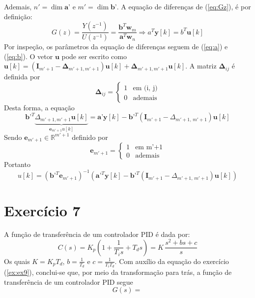 \documentclass{article}
\begin{document}
Ademais, $n' = \dim{\textbf{a'}}$ e $m' = \dim{\textbf{b'}}$. A equação de diferenças de (\ref{eq:Gz}), é por definição:
\begin{equation}
G(z) = \frac{Y(z^{-1})}{U(z^{-1})} = \frac{\textbf{b}^T \textbf{w}_{m}}{\textbf{a}^T \textbf{w}_{n}} \Rightarrow a^T \textbf{y}[k] = b^T \textbf{u}[k]
\label{eq:eqdiferencas}
\end{equation}
Por inspeção, os parâmetros da equação de diferenças seguem de (\ref{eq:a}) e (\ref{eq:b}). O vetor $\textbf{u}$ pode ser escrito como $\textbf{u}[k] = \left(\textbf{I}_{m' + 1} - \mathbf{\Delta}_{m'+1, m'+1}\right) \mathbf{u}[k] + \mathbf{\Delta}_{m'+1, m'+1} \mathbf{u}[k]$. A matriz $\mathbf{\Delta}_{ij}$ é definida por 
\begin{equation}
  \mathbf{\Delta}_{ij} = 
  \begin{cases}
   1 & \mbox{em (i, j)}\\
   0 & \mbox{ademais}
\end{cases}
\end{equation}
Desta forma, a equação 
\begin{equation}
\textbf{b'}^T \underbrace{\Delta_{m' + 1, m' + 1} \textbf{u}[k]}_{\textbf{e}_{m'+1} u[k]} = \textbf{a'} \textbf{y}[k] - \textbf{b'}^T (\textbf{I}_{m'+1} - \Delta_{m' + 1, \, m' + 1}) \textbf{u}[k]
 \end{equation}
Sendo $\textbf{e}_{m'+1} \in \mathbb{R}^{m'+1}$ definido por
\begin{equation}
  \textbf{e}_{m'+1} = 
  \begin{cases}
   1 & \mbox{em m'+1}\\
   0 & \mbox{ademais}
\end{cases}
\end{equation}
Portanto
\begin{equation}
u[k] = (\textbf{b'}^T \textbf{e}_{m' + 1})^{-1}(\textbf{a'}^T \textbf{y}[k] - \textbf{b'}^T (\textbf{I}_{m' + 1} - \Delta_{m' + 1, \, m' + 1}) \textbf{u}[k])
\end{equation}
\section*{Exercício 7}
A função de transferência de um controlador PID é dada por:
\begin{equation}
C(s) = K_p\left(1 + \frac{1}{T_i s} + T_d s\right) = K \, \frac{s^2 + b s + c}{s}
\end{equation}
Os quais $K = K_p T_d $, $b = \frac{1}{T_d}$ e $c = \frac{1}{T_i T_d}$. Com auxílio da equação do exercício (\ref{ex:ex9}), conclui-se que, por meio da transformação para trás, a função de transferência de um controlador PID segue
\begin{equation}
G(s) = \frac{}{}
\end{equation}
\end{document}
